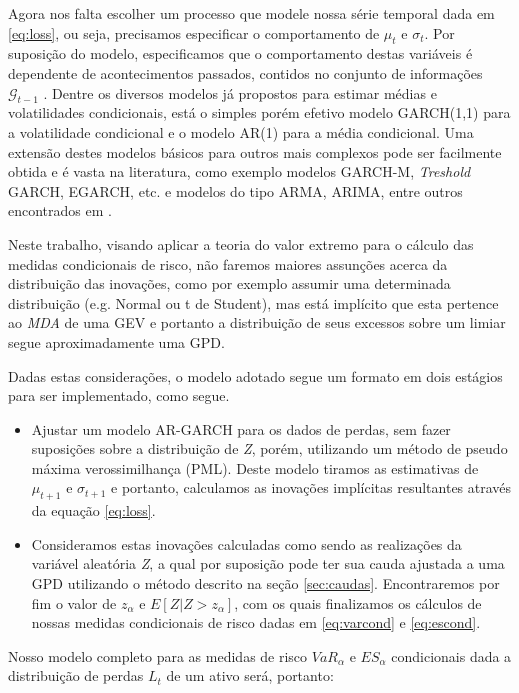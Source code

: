\documentclass[review]{elsarticle}
\theoremstyle{definition}
\begin{document}
Agora nos falta escolher um processo que modele nossa série temporal dada em \eqref{eq:loss}, ou seja, precisamos especificar o comportamento de $\mu_t$ e $\sigma_t$. Por suposição do modelo, especificamos que o comportamento destas variáveis é dependente de acontecimentos passados, contidos no conjunto de informações  $\mathcal{G}_{t-1}$ . Dentre os diversos modelos já propostos para estimar médias e volatilidades condicionais, está o simples porém efetivo modelo GARCH(1,1) para a volatilidade condicional e o modelo AR(1) para a média condicional. Uma extensão destes modelos básicos para outros mais complexos pode ser facilmente obtida e é vasta na literatura, como exemplo modelos GARCH-M, \emph{Treshold} GARCH, EGARCH, etc. e modelos do tipo ARMA, ARIMA, entre outros encontrados em \cite{Tsay2010}. 

Neste trabalho, visando aplicar a teoria do valor extremo para o cálculo das medidas condicionais de risco, não faremos maiores assunções acerca da distribuição das inovações, como por exemplo assumir uma determinada distribuição (e.g. Normal ou t de Student), mas está implícito que esta pertence ao \emph{MDA} de uma GEV e portanto a distribuição de seus excessos sobre um limiar segue aproximadamente uma GPD.

Dadas estas considerações, o modelo adotado segue um formato em dois estágios para ser implementado, como segue.
\begin{itemize}
	\item Ajustar um modelo AR-GARCH para os dados de perdas, sem fazer suposições sobre a distribuição de \emph{Z}, porém, utilizando um método de pseudo máxima verossimilhança (PML). Deste modelo tiramos as estimativas de $\mu_{t+1}$ e $\sigma_{t+1}$ e portanto, calculamos as inovações implícitas resultantes através da equação \eqref{eq:loss}.
	\item Consideramos estas inovações calculadas como sendo as realizações da variável aleatória \emph{Z}, a qual por suposição pode ter sua cauda ajustada a uma GPD utilizando o método descrito na seção \ref{sec:caudas}. Encontraremos por fim o valor de $z_\alpha$ e $E[Z|Z>z_\alpha]$, com os quais finalizamos os cálculos de nossas medidas condicionais de risco dadas em \eqref{eq:varcond} e \eqref{eq:escond}.
\end{itemize}

Nosso modelo completo para as medidas de risco $VaR_\alpha$ e $ES_\alpha$ condicionais dada a distribuição de perdas $L_t$ de um ativo será, portanto:
\end{document}
